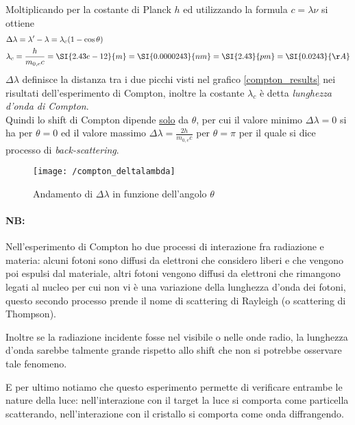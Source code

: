 Moltiplicando per la costante di Planck $h$ ed utilizzando la formula $c = \lambda \nu$ si ottiene
\begin{equation}
\begin{split}
& \Delta \lambda = \lambda' - \lambda = \lambda_c (1 - \cos \theta) \\
& \lambda_c = \frac{ h}{m_{0,e} c } = \SI{2.43e-12}{m} = \SI{0.0000243}{nm} = \SI{2.43}{pm} = \SI{0.0243}{\AA}
\end{split}
\end{equation}
$\Delta \lambda$ definisce la distanza tra i due picchi visti nel grafico \ref{compton_results} nei risultati dell'esperimento di Compton, inoltre la costante $\lambda_c$ è detta \textit{lunghezza d'onda di Compton}. \\
Quindi lo shift di Compton dipende \underline{solo} da $\theta$, per cui il valore minimo $\Delta \lambda = 0$ si ha per $\theta = 0$ ed il valore massimo $\Delta \lambda = \frac{ 2 h }{m_{0,e} c }$ per $\theta = \pi$ per il quale si dice processo di \textit{back-scattering}.
\begin{figure}[h]
\centering
\texttt{[image: /compton\_deltalambda]}
\caption{Andamento di $\Delta\lambda$ in funzione dell'angolo $\theta$}
\end{figure}

\paragraph{NB:} 
Nell'esperimento di Compton ho due processi di interazione fra radiazione e materia: alcuni fotoni sono diffusi da elettroni che considero liberi e che vengono poi espulsi dal materiale, altri fotoni vengono diffusi da elettroni che rimangono legati al nucleo per cui non vi è una variazione della lunghezza d'onda dei fotoni, questo secondo processo prende il nome di scattering di Rayleigh (o scattering di Thompson).

Inoltre se la radiazione incidente fosse nel visibile o nelle onde radio, la lunghezza d'onda sarebbe talmente grande rispetto allo shift che non si potrebbe osservare tale fenomeno.

E per ultimo notiamo che questo esperimento permette di verificare entrambe le nature della luce: nell'interazione con il target la luce si comporta come particella scatterando, nell'interazione con il cristallo si comporta come onda diffrangendo.



